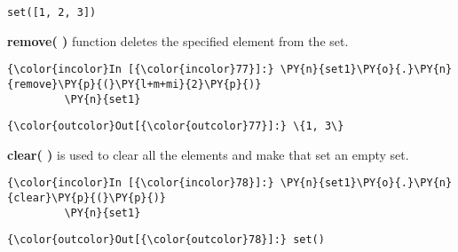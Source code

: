     \begin{Verbatim}[commandchars=\\\{\}]
set([1, 2, 3])
    \end{Verbatim}

    \textbf{remove( )} function deletes the specified element from the set.

    \begin{Verbatim}[commandchars=\\\{\}]
{\color{incolor}In [{\color{incolor}77}]:} \PY{n}{set1}\PY{o}{.}\PY{n}{remove}\PY{p}{(}\PY{l+m+mi}{2}\PY{p}{)}
         \PY{n}{set1}
\end{Verbatim}

            \begin{Verbatim}[commandchars=\\\{\}]
{\color{outcolor}Out[{\color{outcolor}77}]:} \{1, 3\}
\end{Verbatim}
        
    \textbf{clear( )} is used to clear all the elements and make that set an
empty set.

    \begin{Verbatim}[commandchars=\\\{\}]
{\color{incolor}In [{\color{incolor}78}]:} \PY{n}{set1}\PY{o}{.}\PY{n}{clear}\PY{p}{(}\PY{p}{)}
         \PY{n}{set1}
\end{Verbatim}

            \begin{Verbatim}[commandchars=\\\{\}]
{\color{outcolor}Out[{\color{outcolor}78}]:} set()
\end{Verbatim}
        

  \newpage
  
    
    
    
    
